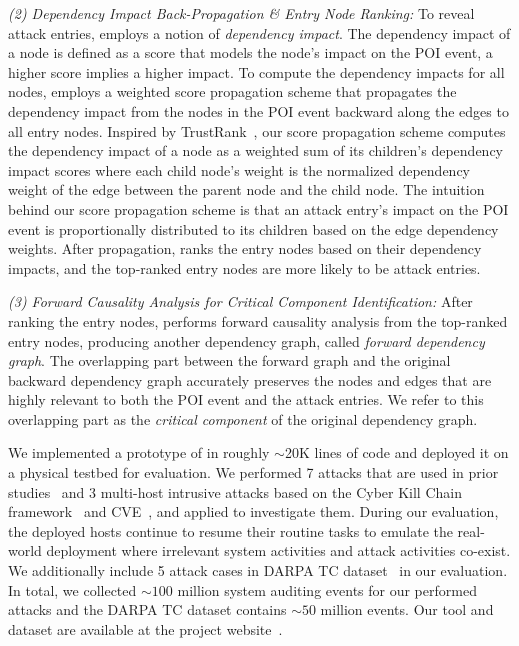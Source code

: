 \emph{(2) Dependency Impact Back-Propagation \& Entry Node Ranking:} 
To reveal attack entries, \tool employs a notion of \emph{dependency impact}. The dependency impact of a node is defined as a score that models the node's impact on the POI event, \ie a higher score implies a higher impact.
To compute the dependency impacts for all nodes, \tool employs a weighted score propagation scheme that propagates the dependency impact from the nodes in the POI event backward along the edges to all entry nodes.
Inspired by TrustRank~\cite{Gyongyi:2004:vldb}, our score propagation scheme computes the dependency impact of a node as a weighted sum of its children's dependency impact scores where each child node's weight is the normalized  dependency weight of the edge between the parent node and the child node.
The intuition behind our score propagation scheme is that an attack entry's impact on the POI event is proportionally distributed to its children based on the edge dependency weights. 
After propagation, \tool ranks the entry nodes based on their dependency impacts, and the top-ranked entry nodes are more likely to be attack entries.

\emph{(3) Forward Causality Analysis for Critical Component Identification:} 
After ranking the entry nodes, \tool performs forward causality analysis from the top-ranked entry nodes, producing another dependency graph, called \textit{forward dependency graph}. 
The overlapping part between the forward graph and the original backward dependency graph accurately preserves the nodes and edges that are highly relevant to both the POI event and the attack entries. 
We refer to this  overlapping part as the \emph{critical component} of the original dependency graph.

We implemented a prototype of \tool in roughly $\sim$20K lines of code and deployed it on a physical testbed for evaluation.
We performed 7 attacks that are used in prior studies~\cite{exploitdb,liu2018priotracker,kwon2018mci,reduction} and 3 multi-host intrusive attacks based on the Cyber Kill Chain framework~\cite{cyberkillchain} and CVE~\cite{cve}, and applied \tool to investigate them. 
During our evaluation, the deployed hosts continue to resume their routine tasks to emulate the real-world deployment where irrelevant system activities and attack activities co-exist. 
We additionally include 5 attack cases in DARPA TC dataset~\cite{tc} in our evaluation. 
In total, we collected ${\sim}100$ million system auditing events for our performed attacks and the DARPA TC dataset contains ${\sim}50$ million events.
Our tool and dataset are available at the project website~\cite{depimpact}.

